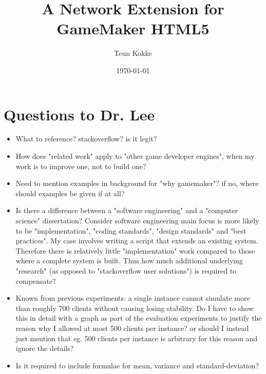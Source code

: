 \documentclass[bsc,frontabs,twoside,singlespacing,parskip,deptreport]{infthesis}     %
\begin{document}
\title{A Network Extension for GameMaker HTML5}

\author{Teun Kokke}

\date{\today}


\maketitle

\section*{Questions to Dr. Lee}
\begin{itemize}
\item What to reference? stackoverflow? is it legit?
\item How does "related work" apply to "other game developer engines", when my work is to improve one, not to build one?
\item Need to mention examples in background for "why gamemaker"? if no, where should examples be given if at all?
\item Is there a difference between a "software engineering" and a "computer science" dissertation? Consider software engineering main focus is more likely to be "implementation", "coding standards", "design standards" and "best practices". My case involves writing a script that extends an existing system. Therefore there is relatively little "implementation" work compared to those where a complete system is built. Thus how much additional underlying "research" (as opposed to "stackoverflow user solutions") is required to compensate?
\item Known from previous experiments: a single instance cannot simulate more than roughly 700 clients without causing losing stability. Do I have to show this in detail with a graph as part of the evaluation experiments to justify the reason why I allowed at most 500 clients per instance? or should I instead just mention that eg. 500 clients per instance is arbitrary for this reason and ignore the details?
\item Is it required to include formulae for mean, variance and standard-deviation?
\end{itemize}
\end{document}
